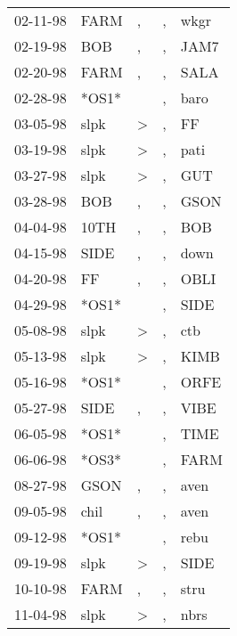 \begin{supertabular}{lllll}
 02-11-98 &   FARM &                , &                , &   wkgr \\
 02-19-98 &    BOB &                , &                , &   JAM7 \\
 02-20-98 &   FARM &                , &                , &   SALA \\
 02-28-98 &  *OS1* &                  &                , &   baro \\
 03-05-98 &   slpk &     \textgreater &                , &     FF \\
 03-19-98 &   slpk &     \textgreater &                , &   pati \\
 03-27-98 &   slpk &     \textgreater &                , &    GUT \\
 03-28-98 &    BOB &                , &                , &   GSON \\
 04-04-98 &   10TH &                , &                , &    BOB \\
 04-15-98 &   SIDE &                , &                , &   down \\
 04-20-98 &     FF &                , &                , &   OBLI \\
 04-29-98 &  *OS1* &                  &                , &   SIDE \\
 05-08-98 &   slpk &     \textgreater &                , &    ctb \\
 05-13-98 &   slpk &     \textgreater &                , &   KIMB \\
 05-16-98 &  *OS1* &                  &                , &   ORFE \\
 05-27-98 &   SIDE &                , &                , &   VIBE \\
 06-05-98 &  *OS1* &                  &                , &   TIME \\
 06-06-98 &  *OS3* &                  &                , &   FARM \\
 08-27-98 &   GSON &                , &                , &   aven \\
 09-05-98 &   chil &                , &                , &   aven \\
 09-12-98 &  *OS1* &                  &                , &   rebu \\
 09-19-98 &   slpk &     \textgreater &                , &   SIDE \\
 10-10-98 &   FARM &                , &                , &   stru \\
 11-04-98 &   slpk &     \textgreater &                , &   nbrs \\

\end{supertabular}
